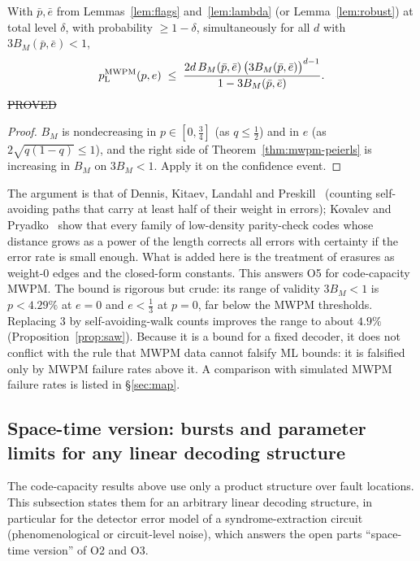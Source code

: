 \begin{corollary}\label{cor:mwpm-cert}
With $\bar p,\bar e$ from Lemmas~\ref{lem:flags} and~\ref{lem:lambda} (or Lemma~\ref{lem:robust}) at total level $\delta$, with probability $\ge1-\delta$, simultaneously for all $d$ with $3B_M(\bar p,\bar e)<1$,
\[
p_{\mathrm{L}}^{\rm MWPM}(p,e)\;\le\;\frac{2d\,B_M(\bar p,\bar e)\,\big(3B_M(\bar p,\bar e)\big)^{d-1}}{1-3B_M(\bar p,\bar e)}.
\]
\hfill\st{PROVED}
\end{corollary}
\begin{proof}
$B_M$ is nondecreasing in $p\in[0,\tfrac34]$ (as $q\le\tfrac12$) and in $e$ (as $2\sqrt{q(1-q)}\le1$), and the right side of Theorem~\ref{thm:mwpm-peierls} is increasing in $B_M$ on $3B_M<1$. Apply it on the confidence event.
\end{proof}

\noindent The argument is that of Dennis, Kitaev, Landahl and Preskill~\cite{DKLP} (counting self-avoiding paths that carry at least half of their weight in errors); Kovalev and Pryadko~\cite{KovalevPryadko} show that every family of low-density parity-check codes whose distance grows as a power of the length corrects all errors with certainty if the error rate is small enough. What is added here is the treatment of erasures as weight-$0$ edges and the closed-form constants.
This answers O5 for code-capacity MWPM. The bound is rigorous but crude: its range of validity $3B_M<1$ is $p<4.29\%$ at $e=0$ and $e<\tfrac13$ at $p=0$, far below the MWPM thresholds. Replacing $3$ by self-avoiding-walk counts improves the range to about $4.9\%$ (Proposition~\ref{prop:saw}).
Because it is a bound for a fixed decoder, it does not conflict with the rule that MWPM data cannot falsify ML bounds: it is falsified only by MWPM failure rates above it. A comparison with simulated MWPM failure rates is listed in \S\ref{sec:map}.

\subsection{Space-time version: bursts and parameter limits for any linear decoding structure}\label{sec:spacetime}

The code-capacity results above use only a product structure over fault locations. This subsection states them for an arbitrary linear decoding structure, in particular for the detector error model of a syndrome-extraction circuit (phenomenological or circuit-level noise), which answers the open parts ``space-time version'' of O2 and O3.


